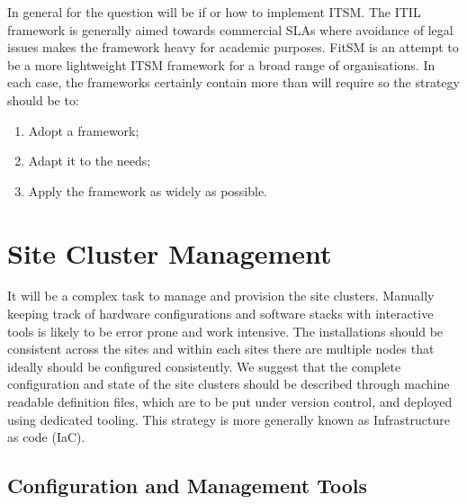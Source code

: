 \documentclass[12pt,a4paper]{article}
\begin{document}
In general for \ED the question will be if or how to implement ITSM.
The ITIL framework is generally aimed towards commercial SLAs where avoidance of legal issues makes the framework heavy for academic purposes.
FitSM is an attempt to be a more lightweight ITSM framework for a broad range of organisations.
In each case, the frameworks certainly contain more than \ED will require so the strategy should be to:
\begin{enumerate}
\item Adopt a framework; 
\item Adapt it to the \ED needs; 
\item Apply the framework as widely as possible.
\end{enumerate}

\section{Site Cluster Management} \label{sec:cluster-man}

It will be a complex task to manage and provision the site
clusters. Manually keeping track of hardware configurations and
software stacks with interactive tools is likely to be error prone and
work intensive. The installations should be consistent across the
sites and within each sites there are multiple nodes that ideally
should be configured consistently. We suggest that the complete
configuration and state of the site clusters should be described
through machine readable definition files, which are to be put under
version control, and deployed using dedicated tooling. 
This strategy is more generally known as Infrastructure as code (IaC).




\subsection{Configuration and Management Tools} \label{sec:config}
\end{document}
